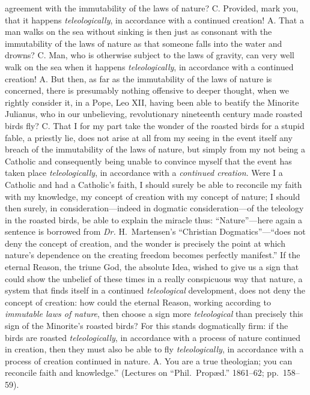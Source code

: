 \documentclass[12pt,a4paper]{article}
\newcommand{\opage}[1]{\marginnote{\footnotesize\textit{[#1]}}}
\begin{document}
agreement with the immutability of the laws of nature? C. Provided,
mark you, that it happens \emph{teleologically}, in accordance
with a continued creation! A. That a
\opage{5}man walks on the sea without sinking is then just as consonant
with the immutability of the laws of nature as that someone falls
into the water and drowns? C. Man, who is otherwise subject to the
laws of gravity, can very well walk on the sea when it happens
\emph{teleologically}, in accordance with a continued creation! A.
But then, as far as the immutability of the laws of nature is
concerned, there is presumably nothing offensive to deeper thought,
when we rightly consider it, in a Pope, Leo XII, having been able to
beatify the Minorite Julianus, who in our unbelieving, revolutionary
nineteenth century made roasted birds fly? C. That I for my part
take the wonder of the roasted birds for a stupid fable, a priestly
lie, does not arise at all from my seeing in the event itself any
breach of the immutability of the laws of nature, but simply from my
not being a Catholic and consequently being unable to convince
myself that the event has taken place \emph{teleologically}, in
accordance with a \emph{continued creation}. Were I a Catholic and
had a Catholic's faith, I should surely be able to reconcile my
faith with my knowledge, my concept of creation with my concept of
nature; I should then surely, in consideration---indeed in dogmatic
consideration---of the teleology in the roasted birds, be able to
explain the miracle thus: ``Nature''---here again a sentence is
borrowed from \textit{Dr.} H.~Martensen's ``Christian
Dogmatics''---``does not deny the concept of creation, and the
wonder is precisely the point at which nature's dependence on the
creating freedom becomes perfectly manifest.'' If the eternal Reason,
the triune God, the absolute Idea, wished to give us a sign that
could show the unbelief of these times in a really conspicuous way
that nature, a system that finds itself in a continued
\emph{teleological} development, does not deny the concept of
creation: how could the eternal Reason, working according to
\emph{immutable laws of nature}, then choose a sign more
\emph{teleological} than precisely this sign of the Minorite's
roasted birds? For this stands dogmatically firm: if the birds are
roasted \emph{teleologically}, in accordance with a process of
nature continued in creation, then they must also be able to fly
\emph{teleologically}, in accordance with a process of creation
continued in nature. A. You are a true theologian; you can
reconcile faith
\opage{6}%
and knowledge.'' (Lectures on ``Phil.\ Propæd.'' 1861--62;
pp.~158--59).
\end{document}
